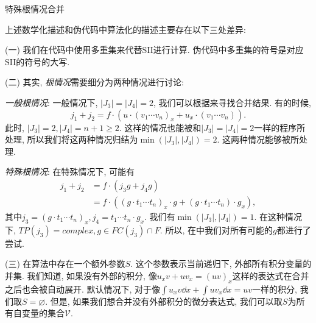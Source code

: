 \begin{algorithm}
\caption{特殊根情况合并}
\label{FindRuleForVars1}
\end{algorithm}

上述数学化描述和伪代码中算法化的描述主要存在以下三处差异:

(一) 我们在代码中使用多重集来代替SII进行计算. 伪代码中多重集的符号是对应SII的符号的大写.

(二) 其实, \emph{根情况}需要细分为两种情况进行讨论:
\begin{asparaenum}[(i)]
\item \emph{一般根情况}: 一般情况下, $|J_3|=|J_4|=2$, 我们可以根据来寻找合并结果. 有的时候, 
\begin{equation}
j_1+j_2 = f \cdot ( u \cdot (v_1 \cdots v_n)_x +  u_x \cdot (v_1 \cdots v_n ) ).
\end{equation}
此时, $|J_3|=2,|J_4|=n+1\ge 2$. 这样的情况也能被和$|J_3|=|J_4|=2$一样的程序所处理, 所以我们将这两种情况归结为$\min(|J_3|,|J_4|)=2$. 这两种情况能够被所处理.
\item \emph{特殊根情况}: 在特殊情况下, 可能有
\begin{equation}
\begin{split}
j_1 + j_2   &= f \cdot ( j_3 g + j_4 g ) \\ 
            &= f \cdot ( (g \cdot t_1\cdots t_n)_x\cdot g + (g \cdot t_1\cdots t_n)\cdot g_x ),
\end{split}
\end{equation}
其中$j_3=(g \cdot t_1\cdots t_n)_x , j_4=t_1\cdots t_n\cdot g_x$. 我们有$\min(|J_3|,|J_4|)=1$. 在这种情况下, $TP(j_3)=complex, g\in FC(j_3)\cap F$. 所以, 在中我们对所有可能的$g$都进行了尝试. 
\end{asparaenum}

(三) 在算法中存在一个额外参数$S$. 这个参数表示当前递归下, 外部所有积分变量的并集. 我们知道, 如果没有外部的积分, 像$u_x v + u v_x = (uv)_x$这样的表达式在合并之后也会被自动展开. 默认情况下, 对于像$\int\!{u_x v\dd x} + \int\!{u v_x\dd x} = uv$一样的积分, 我们取$S=\varnothing$. 但是, 如果我们想合并没有外部积分的微分表达式, 我们可以取$S$为所有自变量的集合$\mathcal{V}$.  

